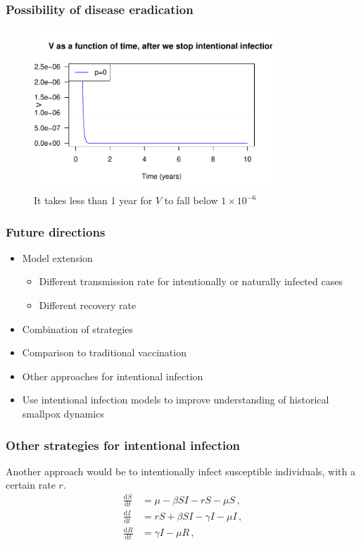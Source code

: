 \documentclass[12pt]{beamer}
\newcommand\dbyd[2]{\frac{\mathrm d{#1}}{\mathrm d{#2}}}
\begin{document}
\begin{frame}
\frametitle{Possibility of disease eradication}
\begin{figure}[H]
  \centering
  \includegraphics[width=0.8\textwidth]{Figures/V_after_stop.pdf}
  \caption{It takes less than 1 year for $V$ to fall below $1\times10^{-6}$}
\end{figure}
\end{frame}
\begin{frame}
\frametitle{Future directions}
\begin{itemize}\itemsep10pt
\item Model extension
\pause
\begin{itemize}\itemsep10pt
\item Different transmission rate for intentionally or naturally infected cases
\pause
\item Different recovery rate
\end{itemize}
\pause
\item Combination of strategies
\pause
\item Comparison to traditional vaccination
\pause
\item Other approaches for intentional infection
\pause
\item Use intentional infection models to improve understanding of
  historical smallpox dynamics
\end{itemize}
\end{frame}
\begin{frame}
\frametitle{Other strategies for intentional infection}

Another approach would be to intentionally infect susceptible individuals, with a certain rate $r$.
\pause
\begin{equation}
\begin{split}
\dbyd{S}{t}&=\mu- \beta SI-rS-\mu S\,, \\
\dbyd{I}{t}&=rS+\beta SI-\gamma I -\mu I\,,\\
\dbyd{R}{t}&=\gamma I-\mu R\,,
\end{split}
\end{equation}
\end{frame}
\end{document}
